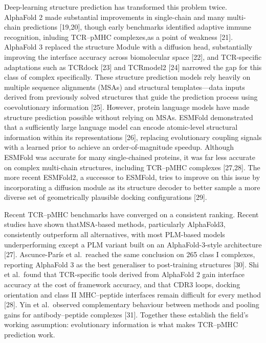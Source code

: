 \documentclass[
  11pt,
]{article}
\begin{document}
Deep-learning structure prediction has transformed this problem twice.
AlphaFold 2 made substantial improvements in single-chain and many multi-chain 
predictions {[}19,20{]}, though early benchmarks identified adaptive immune
recognition, inluding TCR--pMHC complexes,as a point of weakness {[}21{]}. 
AlphaFold 3 replaced the structure Module with a diffusion head, substantially
improving the interface accuracy across biomolecular space {[}22{]}, and
TCR-specific adaptations such as TCRdock {[}23{]} and TCRmodel2 {[}24{]}
narrowed the gap for this class of complex specifically. These structure 
prediction models rely heavily on multiple sequence alignments (MSAs) and 
structural templates—data inputs derived from previously solved structures 
that guide the prediction process using coevolutionary information {[}25{]}. However, protein language models have made 
structure prediction possible without relying on MSAs. ESMFold demonstrated 
that a sufficiently large language model can encode atomic-level structural 
information within its representations {[}26{]}, replacing evolutionary 
coupling signals with a learned prior to achieve an order-of-magnitude speedup.
Although ESMFold was accurate for many single-chained proteins, it was far less
accurate on complex multi-chain structures, including TCR--pMHC complexes {[}27,28{]}. 
The more recent ESMFold2, a successor to ESMFold, tries to improve on this issue
by incorporating a diffusion module as its structure decoder to better sample
a more diverse set of geometrically plausible docking configurations {[}29{]}. 


Recent TCR--pMHC benchmarks have converged on a consistent ranking. Recent studies
have shown thatMSA-based methods, particularly AlphaFold3,
consistently outperform all alternatives, with most PLM-based models
underperforming except a PLM variant built on an AlphaFold-3-style
architecture {[}27{]}. Ascunce-París et al.~reached the same conclusion
on 265 class I complexes, reporting AlphaFold 3 as the best generaliser
to post-training structures {[}30{]}. Shi et al.~found that TCR-specific
tools derived from AlphaFold 2 gain interface accuracy at the cost of
framework accuracy, and that CDR3 loops, docking orientation and class
II MHC--peptide interfaces remain difficult for every method {[}28{]}.
Yin et al.~observed complementary behaviour between methods and pooling
gains for antibody--peptide complexes {[}31{]}. Together these establish
the field's working assumption: evolutionary information is what makes
TCR--pMHC prediction work.
\end{document}
